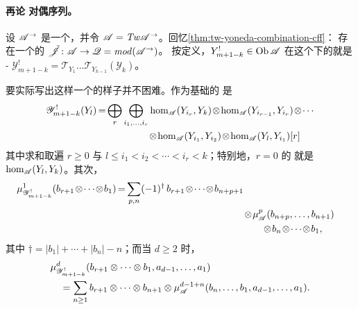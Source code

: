 \paragraph{再论 \trKoszul{}对偶序列。}\label{sub:koszul-duals-revisited}
设 $\mathscr{A}^{\rightarrow}$ 是一个\trDirected\trACategory，并令
$\mathscr{A}=\mathit{Tw}\mathscr{A}^{\rightarrow}$。回忆\cref{thm:tw-yoneda-combination-cff}：
存在一个\trCanonical{}\trCohomology\trFullyFaithful{}的 \trAFunctor{}%
$\tilde{\mathscr{J}}\colon\mathscr{A}\to\mathscr{Q}=\mathit{mod}(\mathscr{A}^{\rightarrow})$。
按定义，$Y^!_{m+1-k}\in\operatorname{Ob}\mathscr{A}$ 在这个\trFunctor{}下的\trImage{}就是%
\trAinfty-\trModule{}%
$\mathscr{Y}^!_{m+1-k}=\mathscr{T}_{Y_1}\ldots\mathscr{T}_{Y_{k-1}}(\mathscr{Y}_k)$。

要实际写出这样一个\trModule{}的样子并不困难。作为基础的\trGraded\trVectorSpace{}%
是
\begin{equation}\label{eq:koszul-module-spaces}
\medmuskip=1.5mu\relax\thickmuskip=3mu\relax
\begin{aligned}
\mathscr{Y}^!_{m+1-k}(Y_l)=\bigoplus_r\bigoplus_{i_1,\ldots,i_r}
&\hom_{\scr{A}}(Y_{i_r},Y_k)\otimes\hom_{\scr{A}}(Y_{i_{r-1}},Y_{i_r})
\otimes\cdots\\
&\otimes\hom_{\scr{A}}(Y_{i_1},Y_{i_2})\otimes\hom_{\scr{A}}(Y_l,Y_{i_1})[r]
\end{aligned}
\end{equation}
其中求和取遍 $r\ge 0$ 与 $l\le i_1<i_2<\cdots<i_r<k$；特别地，$r=0$ 的%
\trDirectSummand{}就是 $\hom_{\mathscr{A}}(Y_l,Y_k)$。其次，
\begin{equation}\label{eq:koszul-module-mu1}
\medmuskip=1.5mu\relax\thickmuskip=3mu\relax
\begin{aligned}
\mu^1_{\mathscr{Y}^!_{m+1-k}}(b_{r+1}\otimes\cdots\otimes b_1)
=\sum_{p,n}(-1)^{\dagger}\,b_{r+1}\otimes\cdots\otimes b_{n+p+1}\\
&\otimes\mu^p_{\scr{A}}(b_{n+p},\ldots,b_{n+1})\\
&\qquad\otimes b_n\otimes\cdots\otimes b_1,
\end{aligned}
\end{equation}
其中 $\dagger=|b_1|+\cdots+|b_n|-n$；而当 $d\ge 2$ 时，
\begin{equation*}
\begin{aligned}
&\mu^d_{\mathscr{Y}^!_{m+1-k}}(b_{r+1}\otimes\cdots\otimes b_1,
a_{d-1},\ldots,a_1)\\
&\quad=\sum_{n\ge 1}b_{r+1}\otimes\cdots\otimes b_{n+1}\otimes
\mu^{d-1+n}_{\mathscr{A}}(b_n,\ldots,b_1,a_{d-1},\ldots,a_1).
\end{aligned}
\end{equation*}

